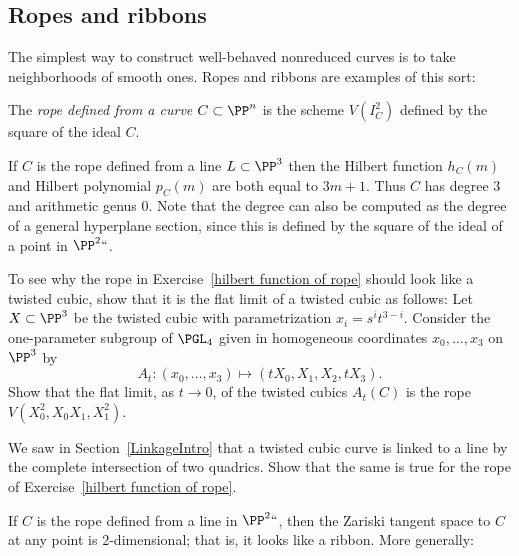 \subsection*{Ropes and ribbons}
The simplest way to construct well-behaved nonreduced curves is
to take neighborhoods of smooth ones. Ropes and ribbons are examples of
this sort:


\begin{definition}
The \emph{rope defined from a curve $C \subset \PP^n$} is the scheme
$V(I^2_C)$ defined by the square of the ideal $C$.
%
\unif
\end{definition}

\begin{exercise}\label{hilbert function of rope}
If $C$ is the rope defined from a line $L\subset \PP^3$ then the Hilbert
function $h_C(m)$ and Hilbert polynomial $p_C(m)$ are both equal to
$3m+1$. Thus $C$ has degree 3 and
arithmetic genus 0. Note that the degree can also be computed as the
degree of
a general hyperplane section, since this is defined by the square of
the ideal of a point
in $\PP^2` `$.
\end{exercise}

\begin{exercise} To see why the rope in Exercise~\ref{hilbert function
of rope} should look like a twisted cubic, show that it is the flat
limit of a twisted cubic as follows:
Let $X \subset \PP^3$ be the twisted cubic with parametrization $x_i =
s^it^{3-i}$. Consider the one-parameter subgroup of $\PGL_4$ given in
homogeneous coordinates $x_0,\dots, x_3$ on $\PP^3$ by
$$
A_t : (x_0,\dots,x_3) \mapsto (tX_0, X_1, X_2,tX_3).
$$
Show that the 
flat limit,
%
 as $t\to 0$, of the 
%
twisted cubics
 $A_t(C)$
is the rope $V(X_0^2, X_0X_1,X_1^2)$.
\end{exercise}

\begin{exercise}\label{line and rope}
We saw in Section~\ref{LinkageIntro} that a twisted cubic curve is linked
to a line by the 
complete intersection of two quadrics.
%
Show that the same is true for the rope of
Exercise~\ref{hilbert function of rope}.
\end{exercise}

If $C$ is the rope defined from a line in $\PP^2` `$, then the Zariski
tangent space to $C$ at
any point is 2-dimensional; that is, it looks like a ribbon. More
generally:

